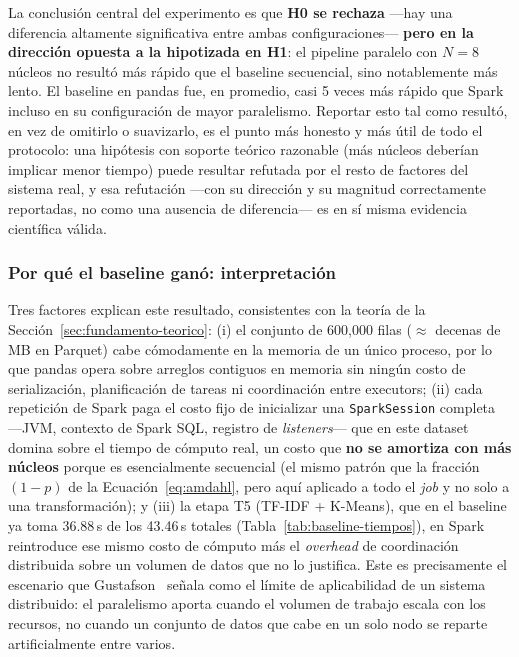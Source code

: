 La conclusión central del experimento es que \textbf{H0 se rechaza} —hay una diferencia
altamente significativa entre ambas configuraciones— \textbf{pero en la dirección opuesta a la
hipotizada en H1}: el pipeline paralelo con $N=8$ núcleos no resultó más rápido que el baseline
secuencial, sino notablemente más lento. El baseline en pandas fue, en promedio, casi 5 veces más
rápido que Spark incluso en su configuración de mayor paralelismo. Reportar esto tal como
resultó, en vez de omitirlo o suavizarlo, es el punto más honesto y más útil de todo el protocolo:
una hipótesis con soporte teórico razonable (más núcleos deberían implicar menor tiempo) puede
resultar refutada por el resto de factores del sistema real, y esa refutación —con su dirección y
su magnitud correctamente reportadas, no como una ausencia de diferencia— es en sí misma evidencia
científica válida.

\subsubsection{Por qué el baseline ganó: interpretación}

Tres factores explican este resultado, consistentes con la teoría de la
Sección~\ref{sec:fundamento-teorico}: (i) el conjunto de 600{,}000 filas ($\approx$ decenas de MB
en Parquet) cabe cómodamente en la memoria de un único proceso, por lo que pandas opera sobre
arreglos contiguos en memoria sin ningún costo de serialización, planificación de tareas ni
coordinación entre executors; (ii) cada repetición de Spark paga el costo fijo de inicializar una
\texttt{SparkSession} completa —JVM, contexto de Spark SQL, registro de \emph{listeners}— que en
este dataset domina sobre el tiempo de cómputo real, un costo que \textbf{no se amortiza con más
núcleos} porque es esencialmente secuencial (el mismo patrón que la fracción $(1-p)$ de la
Ecuación~\ref{eq:amdahl}, pero aquí aplicado a todo el \emph{job} y no solo a una transformación);
y (iii) la etapa T5 (TF-IDF + K-Means), que en el baseline ya toma 36.88\,s de los 43.46\,s totales
(Tabla~\ref{tab:baseline-tiempos}), en Spark reintroduce ese mismo costo de cómputo más el
\emph{overhead} de coordinación distribuida sobre un volumen de datos que no lo justifica. Este es
precisamente el escenario que Gustafson~\cite{gustafson1988reevaluating} señala como el límite de
aplicabilidad de un sistema distribuido: el paralelismo aporta cuando el volumen de trabajo escala
con los recursos, no cuando un conjunto de datos que cabe en un solo nodo se reparte
artificialmente entre varios.

